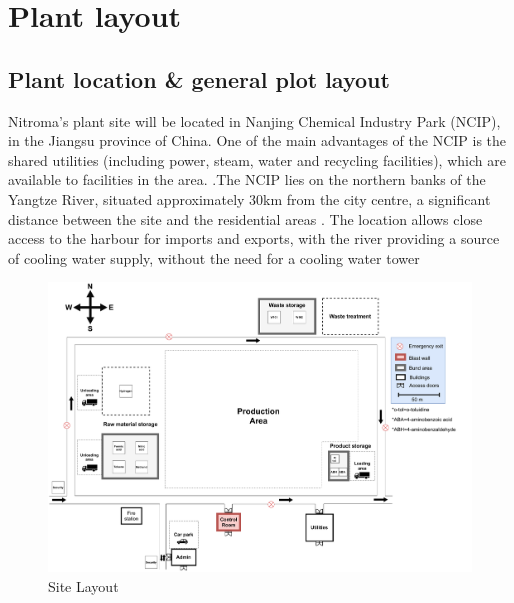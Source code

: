 \section{Plant layout}

\subsection{Plant location \& general plot layout}

Nitroma’s plant site will be located in Nanjing Chemical Industry Park (NCIP), in the Jiangsu province of China. One of the main advantages of the NCIP is the shared utilities (including power, steam, water and recycling facilities), which are available to facilities in the area. \cite{independent_commodity_intelligence_services_china_2007}.The NCIP lies on the northern banks of the Yangtze River, situated approximately 30km from the city centre, a significant distance between the site and the residential areas \cite{zeng_divergent_2011}. The location allows close access to the harbour for imports and exports, with the river providing a source of cooling water supply, without the need for a cooling water tower

\begin{figure}
\centering
\includegraphics[width=\linewidth]{chapters/5-safety-layout-environment/figures/Plant layout.pdf}
\caption{Site Layout}
\label{fig:site}
\end{figure}

